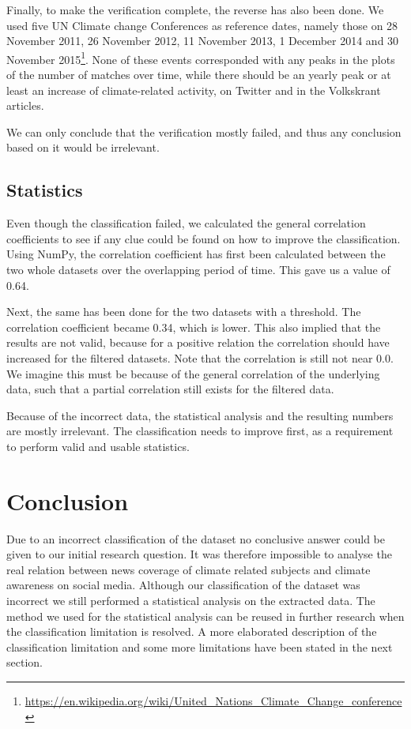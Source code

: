 \documentclass[paper=a4, fontsize=9px]{scrartcl} %
\numberwithin{equation}{section} %
\numberwithin{figure}{section} %
\numberwithin{table}{section} %
\begin{document}
\begin{multicols}{2}
Finally, to make the verification complete, the reverse has also been done. We used five UN Climate change Conferences as reference dates, namely those on 28 November 2011, 26 November 2012, 11 November 2013, 1 December 2014 and 30 November 2015\footnote{\url{https://en.wikipedia.org/wiki/United\_Nations\_Climate\_Change\_conference}}. None of these events corresponded with any peaks in the plots of the number of matches over time, while there should be an yearly peak or at least an increase of climate-related activity, on Twitter and in the Volkskrant articles.

We can only conclude that  the verification mostly failed, and thus any conclusion based on it would be irrelevant.


\subsection{Statistics}

Even though the classification failed, we calculated the general correlation coefficients to see if any clue could be found on how to improve the classification. Using NumPy, the correlation coefficient has first been calculated between the two whole datasets over the overlapping period of time. This gave us a value of 0.64. 

Next, the same has been done for the two datasets with a threshold. The correlation coefficient  became 0.34, which is lower. This also implied that the results are not valid, because for a positive relation the correlation should have increased for the filtered datasets. Note that the correlation is still not near 0.0. We imagine this must be because of the general correlation of the underlying data, such that a partial correlation still exists for the filtered data.

Because of the incorrect data, the statistical analysis and the resulting numbers are mostly irrelevant. The classification needs to improve first, as a requirement to perform valid and usable statistics. 

\section{Conclusion}\label{sec:conclusion}

Due to an incorrect classification of the dataset no conclusive answer could be given to our initial research question. It was therefore impossible to analyse the real relation between news coverage of climate related subjects and climate awareness on social media. Although our classification of the dataset was incorrect we still performed a statistical analysis on the extracted data. The method we used for the statistical analysis can be reused in further research when the classification limitation is resolved.  A more elaborated description of the classification limitation and some more limitations have been stated in the next section. 



\end{multicols}
\end{document}
